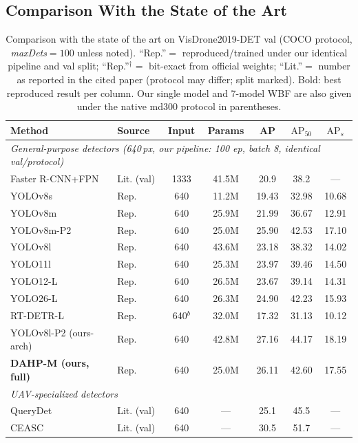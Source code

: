 \documentclass[journal]{IEEEtran}
\newcommand{\ap}{\textup{AP}}
\newcommand{\apf}{\ensuremath{\mathrm{AP}_{50}}}
\newcommand{\aps}{\ensuremath{\mathrm{AP}_{s}}}
\newcommand{\visdrone}{VisDrone2019-DET}
\begin{document}
\subsection{Comparison With the State of the Art}
\label{sec:main}
\begin{table}[!t]
\centering
\caption{Comparison with the state of the art on \visdrone{} val (COCO protocol, \emph{maxDets}$=100$ unless noted). ``Rep.''$=$ reproduced/trained under our identical pipeline and val split; ``Rep.''$^\dagger$$=$ bit-exact from official weights; ``Lit.''$=$ number as reported in the cited paper (protocol may differ; split marked). Bold: best reproduced result per column. Our single model and 7-model WBF are also given under the native md300 protocol in parentheses.}
\label{tab:main}
\begin{tabular}{llccccc}
\toprule
Method & Source & Input & Params & \ap & \apf & \aps \\
\midrule
\multicolumn{7}{l}{\emph{General-purpose detectors (640\,px, our pipeline: 100 ep, batch 8, identical val/protocol)}}\\
Faster R-CNN+FPN \cite{frcnn} & Lit. (val) & 1333 & 41.5M & 20.9 & 38.2 & --- \\
YOLOv8s \cite{yolov8} & Rep. & 640 & 11.2M & 19.43 & 32.98 & 10.68 \\
YOLOv8m \cite{yolov8} & Rep. & 640 & 25.9M & 21.99 & 36.67 & 12.91 \\
YOLOv8m-P2 & Rep. & 640 & 25.0M & 25.90 & 42.53 & 17.10 \\
YOLOv8l \cite{yolov8} & Rep. & 640 & 43.6M & 23.18 & 38.32 & 14.02 \\
YOLO11l \cite{yolo11} & Rep. & 640 & 25.3M & 23.97 & 39.46 & 14.50 \\
YOLO12-L \cite{yolo12} & Rep. & 640 & 26.5M & 23.67 & 39.14 & 14.31 \\
YOLO26-L \cite{yolo26} & Rep. & 640 & 26.3M & 24.90 & 42.23 & 15.93 \\
RT-DETR-L \cite{rtdetr} & Rep. & 640$^{b}$ & 32.0M & 17.32 & 31.13 & 10.12 \\
YOLOv8l-P2 (ours-arch) & Rep. & 640 & 42.8M & 27.16 & 44.17 & 18.19 \\
\textbf{DAHP-M (ours, full)} & Rep. & 640 & 25.0M & 26.11 & 42.60 & 17.55 \\
\midrule
\multicolumn{7}{l}{\emph{UAV-specialized detectors}}\\
QueryDet \cite{querydet} & Lit. (val) & 640 & --- & 25.1 & 45.5 & --- \\
CEASC \cite{ceasc} & Lit. (val) & 640 & --- & 30.5 & 51.7 & --- \\

\end{tabular}
\end{table}
\end{document}
